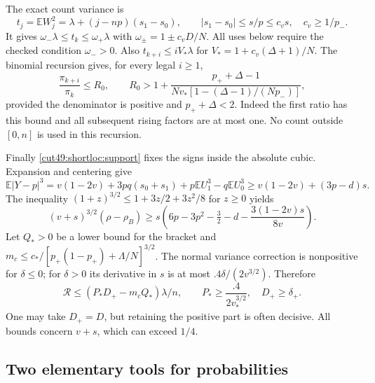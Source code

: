 \documentclass[11pt,a4paper]{article}
\numberwithin{equation}{section}
\theoremstyle{definition}
\theoremstyle{remark}
\begin{document}
The exact count variance is
\begin{equation}\label{cut49:shortloc:variance}
 t_j=\mathbb E W_j^2=\lambda+(j-np)(s_1-s_0),\qquad
 |s_1-s_0|\le s/p\le c_v s,\quad c_v\ge1/p_-.
\end{equation}
It gives $\omega_-\lambda\le t_k\le\omega_+\lambda$ with
$\omega_\pm=1\pm c_vD/N$. All uses below require the checked condition
$\omega_->0$. Also
$t_{k+i}\le iV_*\lambda$ for $V_*=1+c_v(\Delta+1)/N$.
The binomial recursion gives, for every legal $i\ge1$,
\begin{equation}\label{cut49:shortloc:ratio}
 \frac{\pi_{k+i}}{\pi_k}\le R_0,
 \qquad R_0>1+\frac{p_++\Delta-1}
 {Nv_*[1-(\Delta-1)/(Np_-)]},
\end{equation}
provided the denominator is positive and $p_++\Delta<2$.
Indeed the first ratio has this bound and all subsequent rising factors
are at most one. No count outside $[0,n]$ is used in this recursion.

Finally \eqref{cut49:shortloc:support} fixes the signs inside the absolute cubic.
Expansion and centering give
\[
 \mathbb E|Y-p|^3=v(1-2v)+3pq(s_0+s_1)
                   +p\mathbb E U_1^3-q\mathbb E U_0^3
 \ge v(1-2v)+(3p-d)s.
\]
The inequality $(1+z)^{3/2}\le1+3z/2+3z^2/8$ for $z\ge0$ yields
\begin{equation}\label{cut49:shortloc:cubic}
 (v+s)^{3/2}(\rho-\rho_B)\ge s
     \left(6p-3p^2-\tfrac32-d-\frac{3(1-2v)s}{8v}\right).
\end{equation}
Let $Q_*>0$ be a lower bound for the bracket and
$m_c\le c_*/[p_+(1-p_+)+\Lambda/N]^{3/2}$.
The normal variance correction is nonpositive for $\delta\le0$;
for $\delta>0$ its derivative in $s$ is at most $.4\delta/(2v^{3/2})$.
Therefore
\begin{equation}\label{cut49:shortloc:repair}
 \mathcal R\le(P_*D_+-m_cQ_*)\lambda/n,
 \qquad P_*\ge\frac{.4}{2v_*^{3/2}},\quad D_+\ge\delta_+.
\end{equation}
One may take $D_+=D$, but retaining the positive part is often decisive.
All bounds concern $v+s$, which can exceed $1/4$.

\subsection{Two elementary tools for probabilities}
\end{document}
